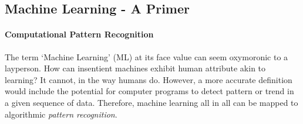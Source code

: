 \subsection{Machine Learning - A Primer}\label{sec:mla}
\paragraph{Computational Pattern Recognition}
The term `Machine Learning' (ML) at its face value can seem oxymoronic to a layperson. How can insentient machines exhibit human attribute akin to learning? It cannot, in the way humans do. However, a more accurate definition would include the potential for computer programs to detect pattern or trend in a given sequence of data. Therefore, machine learning all in all can be mapped to algorithmic \emph{pattern recognition}.

